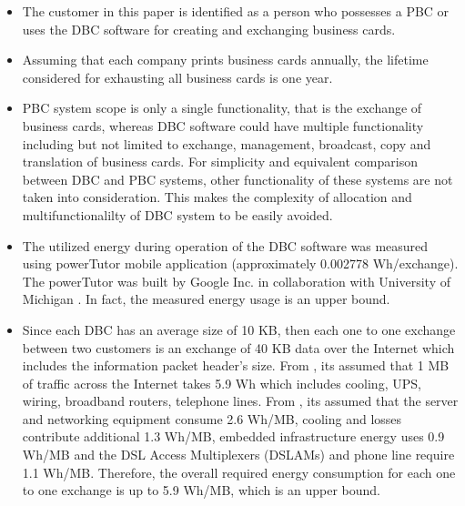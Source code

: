 \documentclass[conference]{IEEEtran}
\begin{document}
\begin{itemize}
\item The customer in this paper is identified as a person who possesses a PBC or uses the DBC software for creating and exchanging business cards.
\item Assuming that each company prints business cards annually, the lifetime considered for exhausting all business cards is one year.
\item PBC system scope is only a single functionality, that is the exchange of business cards, whereas DBC software could have multiple functionality  including but not limited to exchange, management, broadcast, copy and translation of business cards. For simplicity and equivalent comparison between DBC and PBC systems, other functionality of these systems are not taken into consideration. This makes the complexity of allocation and multifunctionalilty of DBC system to be easily avoided.
\item The utilized energy during operation of the DBC software was measured using powerTutor mobile application (approximately 0.002778 Wh/exchange). The powerTutor was built by Google Inc. in collaboration with University of Michigan \cite{zhang2010accurate}. In fact, the measured energy usage is an upper bound.

 \item Since each DBC has an average size of 10 KB, then each one to one exchange between two customers is an exchange of 40 KB data over the Internet which includes the information packet header's size. From \cite{Moshnyaga:2013}, its assumed that 1 MB of traffic across the Internet takes 5.9 Wh which includes cooling, UPS, wiring, broadband routers, telephone lines. From \cite{EnergyDownload}, its assumed that the server and networking equipment consume 2.6 Wh/MB, cooling and losses contribute additional 1.3 Wh/MB, embedded infrastructure energy uses 0.9 Wh/MB and the DSL Access Multiplexers (DSLAMs) and phone line require 1.1 Wh/MB. Therefore, the overall required energy consumption for each one to one exchange is up to 5.9 Wh/MB,  which is an upper bound.

\end{itemize}
\end{document}
